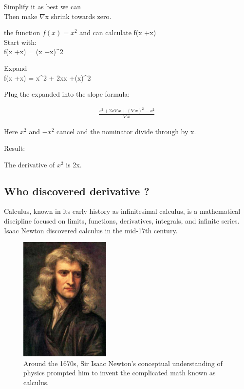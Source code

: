 \documentclass[aps,pra,notitlepage,amsmath,amssymb,letterpaper,12pt]{revtex4-1}
\newenvironment{problem}[2][Problem]{\begin{trivlist}
\item[\hskip \labelsep {\bfseries #1}\hskip \labelsep {\bfseries #2.}]}{\end{trivlist}}
\begin{document}
Simplify it as best we can\\
Then make $\nabla$x shrink towards zero.\\
\begin{problem}{1}
the function $f(x) = x^2$ and can calculate f(x +\nabla x)\\

Start with:\\
f(x +\nabla x) = (x +\nabla x)^2

Expand\\
f(x +\nabla x) = x^2 + 2x\nabla x +(\nabla x)^2

Plug the expanded into the slope formula:

\begin{align}
\frac{x^2 + 2x\nabla x +(\nabla x)^2 - x^2}{\nabla x} 
\end{align}

Here $x^2$ and $-x^2$ cancel and the nominator divide through by \nabla x.

Result:

The derivative of $x^2$ is 2x.

\subsection{Who discovered derivative ?} %

Calculus, known in its early history as infinitesimal calculus, is a mathematical discipline focused on limits, functions, derivatives, integrals, and infinite series. Isaac Newton discovered calculus in the mid-17th century.

\begin{figure}[h!] %
  \includegraphics[width=0.4\textwidth]
  {GodfreyKneller-IsaacNewton-1689.jpg}  %
  \caption{Around the 1670s, Sir Isaac Newton's conceptual understanding of physics prompted him to invent the complicated math known as calculus.}
  \label{fig:figlabel}
\end{figure}

\end{problem}
\end{document}
